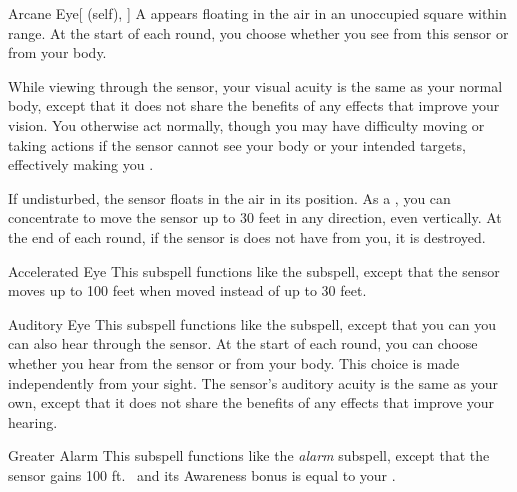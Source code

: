 \begin{ability}[\nth{1}]{Arcane Eye}[ (self), ]
A  appears floating in the air in an unoccupied square within \rngmed range.
At the start of each round, you choose whether you see from this sensor or from your body.

While viewing through the sensor, your visual acuity is the same as your normal body, except that it does not share the benefits of any  effects that improve your vision.
You otherwise act normally, though you may have difficulty moving or taking actions if the sensor cannot see your body or your intended targets, effectively making you \blinded.

If undisturbed, the sensor floats in the air in its position.
As a , you can concentrate to move the sensor up to 30 feet in any direction, even vertically.
At the end of each round, if the sensor is does not have  from you, it is destroyed.
\end{ability}
\vspace{0.25em}



\begin{ability}[\nth{2}]{Accelerated Eye}
This subspell functions like the  subspell, except that the sensor moves up to 100 feet when moved instead of up to 30 feet.
\end{ability}
\vspace{0.25em}



\begin{ability}[\nth{2}]{Auditory Eye}
This subspell functions like the  subspell, except that you can you can also hear through the sensor.
At the start of each round, you can choose whether you hear from the sensor or from your body.
This choice is made independently from your sight.
The sensor's auditory acuity is the same as your own, except that it does not share the benefits of any  effects that improve your hearing.
\end{ability}
\vspace{0.25em}



\begin{ability}[\nth{2}]{Greater Alarm}
This subspell functions like the \textit{alarm} subspell, except that the sensor gains 100 ft.\  and its Awareness bonus is equal to your .
\end{ability}
\vspace{0.25em}




